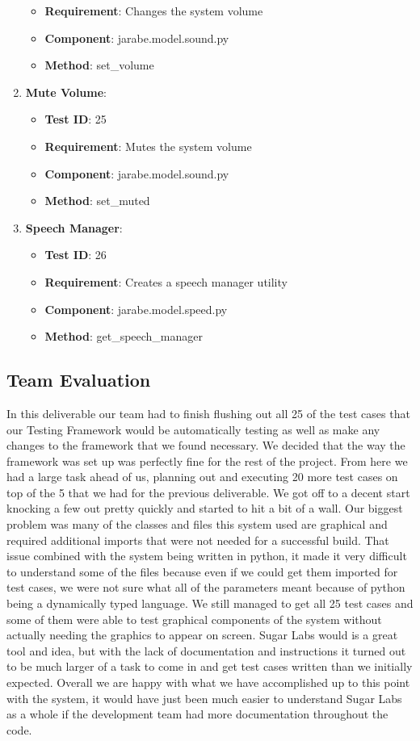 \documentclass{article}
\begin{document}
\begin{enumerate}[noitemsep,topsep=0pt]
\begin{itemize}[noitemsep,topsep=0pt]
\item \textbf{Requirement}: Changes the system volume
\item \textbf{Component}: jarabe.model.sound.py
\item \textbf{Method}: set\_volume
\end{itemize}
\item \textbf{Mute Volume}:
\begin{itemize}[topsep=0pt]
\item \textbf{Test ID}: 25
\item \textbf{Requirement}: Mutes the system volume
\item \textbf{Component}: jarabe.model.sound.py
\item \textbf{Method}: set\_muted
\end{itemize}
\item \textbf{Speech Manager}:
\begin{itemize}[noitemsep,topsep=0pt]
\item \textbf{Test ID}: 26
\item \textbf{Requirement}: Creates a speech manager utility
\item \textbf{Component}: jarabe.model.speed.py
\item \textbf{Method}: get\_speech\_manager
\end{itemize}
\end{enumerate}
\subsection{Team Evaluation}
In this deliverable our team had to finish flushing out all 25 of the test cases that our Testing Framework would be automatically testing as well as make any changes to the framework that we found necessary. We decided that the way the framework was set up was perfectly fine for the rest of the project. From here we had a large task ahead of us, planning out and executing 20 more test cases on top of the 5 that we had for the previous deliverable. We got off to a decent start knocking a few out pretty quickly and started to hit a bit of a wall. Our biggest problem was many of the classes and files this system used are graphical and required additional imports that were not needed for a successful build. That issue combined with the system being written in python, it made it very difficult to understand some of the files because even if we could get them imported for test cases, we were not sure what all of the parameters meant because of python being a dynamically typed language. We still managed to get all 25 test cases and some of them were able to test graphical components of the system without actually needing the graphics to appear on screen. Sugar Labs would is a great tool and idea, but with the lack of documentation and instructions it turned out to be much larger of a task to come in and get test cases written than we initially expected. Overall we are happy with what we have accomplished up to this point with the system, it would have just been much easier to understand Sugar Labs as a whole if the development team had more documentation throughout the code.
\end{document}
